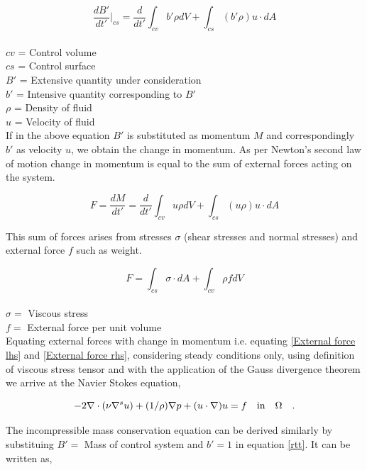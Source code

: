 \documentclass[a4paper,openany]{book}
\begin{document}
\begin{equation} \label{rtt} 
\frac{dB'}{dt'}|_{cs} = \frac{d}{dt'} \int_{cv} b' \rho dV + \int_{cs} (b' \rho) u\cdot dA 
\end{equation}
{}\\
$cv$ = Control volume\\
$cs$ = Control surface\\
$B'$ = Extensive quantity under consideration  \\
$b'$ = Intensive quantity corresponding to $B'$ \\
$\rho$ = Density of fluid \\
$u$ = Velocity of fluid\\

If in the above equation $B'$ is substituted as momentum $M$ and correspondingly $b'$ as velocity $u$, we obtain the change in momentum. As per Newton's second law of motion change in momentum is equal to the sum of external forces acting on the system. 

\begin{equation}\label{External force lhs}
F = \frac{dM}{dt'} = \frac{d}{dt'} \int_{cv} u \rho dV + \int_{cs} (u \rho) u\cdot dA 
\end{equation}

This sum of forces arises from stresses $\sigma$ (shear stresses and normal stresses) and external force $f$ such as weight. 

\begin{equation}\label{External force rhs}
F = \int_{cs} \sigma \cdot dA + \int_{cv} \rho f dV
\end{equation}
\\
$\sigma =$ Viscous stress\\
$f =$ External force per unit volume\\

Equating external forces with change in momentum i.e. equating \eqref{External force lhs} and \eqref{External force rhs}, considering steady conditions only, using definition of viscous stress tensor and with the application of the Gauss divergence theorem we arrive at the Navier Stokes equation,

\begin{equation} \label{navier_stokes}
-2\nabla \cdot (\nu \nabla^s u) + (1/\rho) \nabla p + (u \cdot \nabla)u = f \quad   \textnormal{in}  \quad \Omega \quad \textrm{.}
\end{equation} 

The incompressible mass conservation equation can be derived similarly by substituing $B' =$ Mass of control system and $b' = 1$ in equation \eqref{rtt}.  It can be written as,
\end{document}
